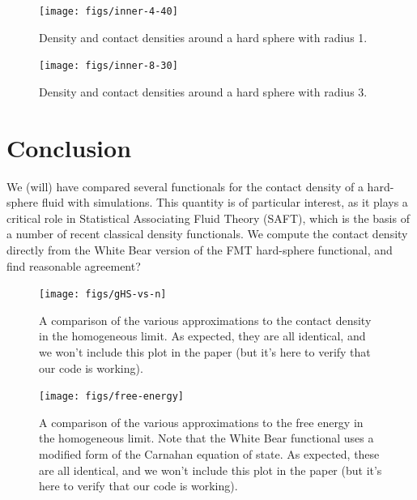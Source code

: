 \documentclass[letterpaper,twocolumn,amsmath,amssymb,prb]{revtex4-1}
\begin{document}
\begin{figure}
  \texttt{[image: figs/inner-4-40]}
  \caption{Density and contact densities around a hard sphere with
    radius 1.}
  \label{fig:inner-4-40}
\end{figure}

\begin{figure}
  \texttt{[image: figs/inner-8-30]}
  \caption{Density and contact densities around a hard sphere with
    radius 3.}
  \label{fig:inner-8-30}
\end{figure}

\section{Conclusion}
We (will) have compared several functionals for the contact density of
a hard-sphere fluid with simulations.  This quantity is of particular
interest, as it plays a critical role in Statistical Associating Fluid
Theory (SAFT), which is the basis of a number of recent classical
density functionals.  We compute the contact density directly from the
White Bear version of the FMT hard-sphere functional, and find
reasonable agreement?

\appendix

\begin{figure}
\texttt{[image: figs/gHS-vs-n]}
\caption{A comparison of the various approximations to the contact
  density in the homogeneous limit.  As expected, they are all
  identical, and we won't include this plot in the paper (but it's
  here to verify that our code is working).}
\label{fig:gHS-vs-n}
\end{figure}

\begin{figure}
\texttt{[image: figs/free-energy]}
\caption{A comparison of the various approximations to the free energy
  in the homogeneous limit.  Note that the White Bear functional uses
  a modified form of the Carnahan equation of state.  As expected,
  these are all identical, and we won't include this plot in the paper
  (but it's here to verify that our code is working).}
\label{fig:free-energy}
\end{figure}
\end{document}
